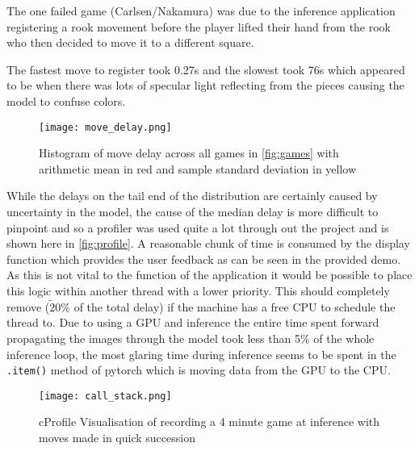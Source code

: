 The one failed game (Carlsen/Nakamura) was due to the inference application registering a rook movement before the 
player lifted their hand from the rook who then decided to move it to a different square.

The fastest move to register took 0.27s and the slowest took 76s which appeared to be when there 
was lots of specular light reflecting from the pieces causing the model to confuse colors.

\begin{figure}[h]
    \centering
    \texttt{[image: move\_delay.png]}
    \caption{Histogram of move delay across all games in \autoref{fig:games} with arithmetic mean in red and sample standard deviation in yellow}
\label{fig:delay}
\end{figure}

\FloatBarrier
While the delays on the tail end of the distribution are certainly caused by uncertainty in the model, the cause of the median delay is more difficult to 
pinpoint and so a profiler was used quite a lot through out the project and is shown here in \autoref{fig:profile}.  A reasonable chunk of time is consumed 
by the display function which provides the user feedback as can be seen in the provided demo.  As this is not vital to the function of the application it would 
be possible to place this logic within another thread with a lower priority.  This should completely remove ($\tilde20\%$ of the total delay) if the machine
has a free CPU to schedule the thread to.  Due to using a GPU and inference the entire time spent forward propagating the images through the model took less than 
5\% of the whole inference loop, the most glaring time during inference seems to be spent in the \verb|.item()| method of pytorch which is moving data from the GPU to 
the CPU. 

\begin{figure}[h]
    \centering
    \texttt{[image: call\_stack.png]}
    \caption{cProfile Visualisation of recording a 4 minute game at inference with moves made in quick succession}
    \label{fig:profile}
\end{figure}